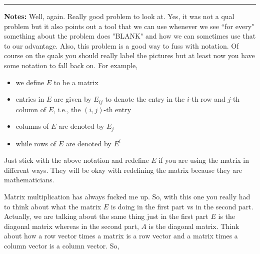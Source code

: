 \documentclass{article}
\begin{document}
\hrule 

\textbf{Notes:} Well, again. Really good problem to look at. Yes, it was not a qual problem but it also points out a tool that we can use whenever we see ``for every" something about the problem does "BLANK" and how we can sometimes use that to our advantage. Also, this problem is a good way to fuss with notation. Of course on the quals you should really label the pictures but at least now you have some notation to fall back on. For example, 
	\begin{itemize}
		\item we define $E$ to be a matrix
		\item entries in $E$ are given by $E_{ij}$ to denote the entry in the $i$-th row and $j$-th 
			column of $E$, i.e., the $(i,j)$-th entry
		\item columns of $E$ are denoted by $E_j$
		\item while rows of $E$ are denoted by $E^i$
	\end{itemize}
Just stick with the above notation and redefine $E$ if you are using the matrix in different ways. They will be okay with 
redefining the matrix because they are mathematicians. 

Matrix multiplication has always fucked me up. So, with this one you really had to think about what the matrix $E$ is doing in the first part vs in the second part. Actually, we are talking about the same thing just in the first part $E$ is the diagonal matrix whereas in the second part, $A$ is the diagonal matrix. Think about how a row vector times a matrix is a row vector and a matrix times a column vector is a column vector. So,
\end{document}
